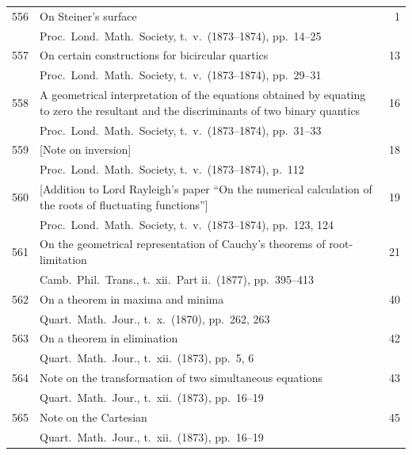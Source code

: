 \documentclass[11pt,a4paper]{book}
\begin{document}
\noindent
\begin{longtable}{r @{. } p{4.8in} r}
556 & On Steiner's surface & 1 \\
  & Proc.\ Lond.\ Math.\ Society, t.\ v.\ (1873--1874), pp.\ 14--25 & \\ 

557 & On certain constructions for bicircular quartics & 13 \\
  & Proc.\ Lond.\ Math.\ Society, t.\ v.\ (1873--1874), pp.\ 29--31 & \\ 

558 & A geometrical interpretation of the equations obtained by equating to zero the resultant and the discriminants of two binary quantics & 16 \\
  & Proc.\ Lond.\ Math.\ Society, t.\ v.\ (1873--1874), pp.\ 31--33 & \\ 

559 & [Note on inversion] & 18 \\
  & Proc.\ Lond.\ Math.\ Society, t.\ v.\ (1873--1874), p.\ 112 & \\ 

560 & [Addition to Lord Rayleigh's paper ``On the numerical calculation of the roots of fluctuating functions''] & 19 \\
  & Proc.\ Lond.\ Math.\ Society, t.\ v.\ (1873--1874), pp.\ 123, 124 & \\ 

561 & On the geometrical representation of Cauchy's theorems of root-limitation & 21 \\
  & Camb.\ Phil.\ Trans., t.\ xii.\ Part ii.\ (1877), pp.\ 395--413 & \\ 

562 & On a theorem in maxima and minima & 40 \\
  & Quart.\ Math.\ Jour., t.\ x.\ (1870), pp.\ 262, 263 & \\ 

563 & On a theorem in elimination & 42 \\
  & Quart.\ Math.\ Jour., t.\ xii.\ (1873), pp.\ 5, 6 & \\ 

564 & Note on the transformation of two simultaneous equations & 43 \\
  & Quart.\ Math.\ Jour., t.\ xii.\ (1873), pp.\ 16--19 & \\ 

565 & Note on the Cartesian & 45 \\
  & Quart.\ Math.\ Jour., t.\ xii.\ (1873), pp.\ 16--19 & \\ 


\end{longtable}
\end{document}
